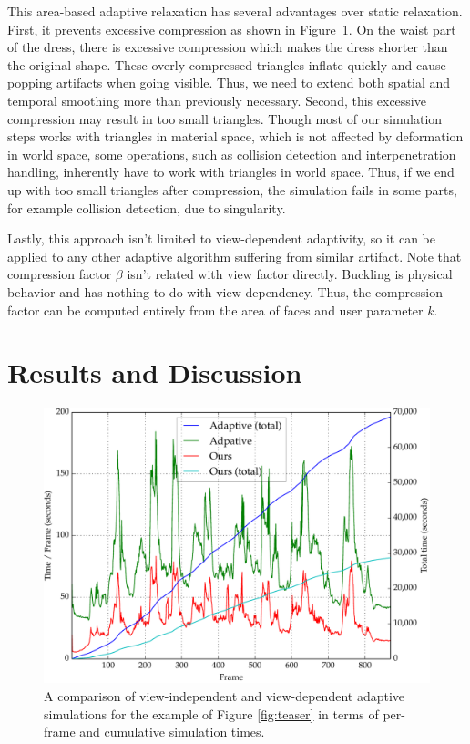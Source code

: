 \documentclass[10pt,journal,compsoc,twoside]{TexInputs/IEEEtran}
\begin{document}
This area-based adaptive relaxation has several advantages over static relaxation.  First,
it prevents excessive compression as shown in Figure~\ref{}. On the waist part of the
dress, there is excessive compression which makes the dress shorter than the original
shape. These overly compressed triangles inflate quickly and cause popping artifacts when
going visible. Thus, we need to extend both spatial and temporal smoothing more than
previously necessary.  Second, this excessive compression may result in too small
triangles. Though most of our simulation steps works with triangles in material space,
which is not affected by deformation in world space, some operations, such as collision
detection and interpenetration handling, inherently have to work with triangles in world
space.  Thus, if we end up with too small triangles after compression, the simulation
fails in some parts, for example collision detection, due to singularity.

Lastly, this approach isn't limited to view-dependent adaptivity, so it can be applied to
any other adaptive algorithm suffering from similar artifact.  Note that compression
factor $\beta$ isn't related with view factor directly. Buckling is physical behavior and
has nothing to do with view dependency. Thus, the compression factor can be computed
entirely from the area of faces and user parameter $k$.


\section{Results and Discussion}

\begin{figure}[t]
    \centering
    \includegraphics[width=1.0\columnwidth]{timings}
    \caption{A comparison of view-independent and view-dependent adaptive simulations for
        the example of Figure \ref{fig:teaser} in terms of per-frame and cumulative simulation times.}
    \label{fig:comparison}
\end{figure}
\end{document}
